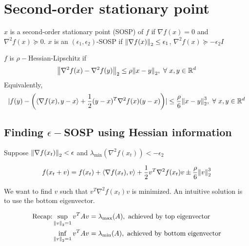 \section{Second-order stationary point}

\begin{definition} 
    \(x\) is a second-order stationary point (SOSP) of \(f\) if \(\nabla f(x) = 0\) and 
    \(\nabla^2 f(x) \succeq 0\). \(x\) is an \((\epsilon_1, \epsilon_2)\)-SOSP if 
    \(\norm{\nabla f(x)}_2 \leq \epsilon_1\), \(\nabla^2 f(x) \succeq - \epsilon_2 I \)
\end{definition}

\begin{definition}
    \(f\) is \(\rho-\)Hessian-Lipschitz if 
    \[
        \norm{\nabla^2 f(x) - \nabla^2 f(y)}_2 \leq \rho \norm{x - y}_2, \ \forall \ x,y \in \mathbb{R}^d
    \]
    Equivalently, 
    \[
    \lvert  f(y) -  \left( \langle \nabla f(x), y-x \rangle + \frac{1}{2} (y - x)^T \nabla^2 f(x) (y - x) \right) \rvert \leq \frac{\rho}{6} \norm{x - y}_2^3, \ \forall \ x, y \in \mathbb{R}^d
    \]
\end{definition}


\subsection*{Finding \(\epsilon-\)SOSP using Hessian information}

Suppose \(\norm{\nabla f(x_t)}_2 < \epsilon\) and \(\lambda_{\text{min}}(\nabla^2 f(x_t)) < - \epsilon_2\) 

\begin{align*}
    f(x_t + v) = f(x_t) + \langle \nabla f(x_t), v \rangle + \frac{1}{2} v^T \nabla^2 f(x_t)v \pm \frac{\rho}{6} \norm{v}_2^3
\end{align*}

We want to find \(v\) such that \(v^T \nabla^2 f(x_t)v\) is minimized. 
An intuitive solution is to use the bottom eigenvector. 

\begin{align*}
    \text{Recap:}   &\sup_{\norm{v}_2 = 1} v^TAv = \lambda_{\text{max}}(A), \text{ achieved by top eigenvector} \\ 
    &\inf_{\norm{v}_2 = 1} v^TAv = \lambda_{\text{min}}(A), \text{ achieved by bottom eigenvector}
\end{align*}

